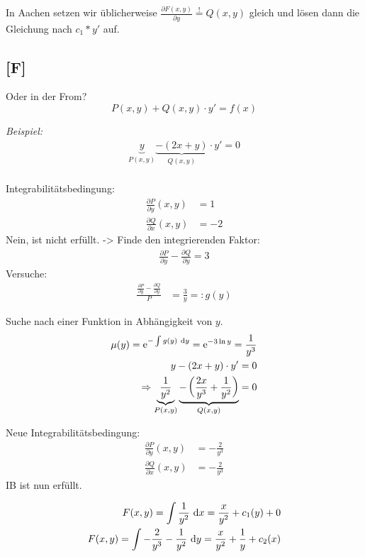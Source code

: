 \documentclass[main.tex]{subfiles}
\begin{document}
In Aachen setzen wir üblicherweise $\frac{\partial F(x,y)}{\partial y} \overset{!}{=} Q(x,y)$ gleich und lösen dann die Gleichung nach $c_1 * y'$ auf.

\subsection{[F]}
\vspace{6cm}
Oder in der From? 
$$
	P(x,y) + Q(x,y)\cdot y' = f(x)
$$

\textit{Beispiel:}
\begin{align*}
	\underbrace{y}_{P(x,y)} \underbrace{- (2x +y)}_{Q(x,y)} \cdot y' = 0 \\
\end{align*}

Integrabilitätsbedingung:
\begin{align*}
	\frac{\partial P}{\partial y}(x,y) &= 1 \\
	\frac{\partial Q}{\partial x}(x,y) &= -2 
\end{align*}
Nein, ist nicht erfüllt. 
-> Finde den integrierenden Faktor:
\begin{align*}
	\frac{\partial P}{\partial y} - \frac{\partial Q}{\partial y} = 3
\end{align*}
Versuche: 
\begin{align*}
	\frac{\frac{\partial P}{\partial y} - \frac{\partial Q}{\partial y}}{P} 
	&= \frac{3}{y} =: g(y)
\end{align*}

Suche nach einer Funktion in Abhängigkeit von $y$. 
\begin{align*}
	\mu(y) = \mathrm{e}^{-\int g(y)~\mathrm{d}y} = \mathrm{e}^{-3\ln y} = \frac{1}{y^3} \\
	y-(2x +y) \cdot y' = 0 \\
	\Rightarrow \underbrace{\frac{1}{y^2}}_{P(x,y)} \underbrace{ -\left(\frac{2x}{y^3} + \frac{1}{y^2} \right)}_{Q(x,y)} = 0
\end{align*}

Neue Integrabilitätsbedingung:
\begin{align*}
	\frac{\partial P}{\partial y}(x,y) &= - \frac{2}{y^3} \\
	\frac{\partial Q}{\partial x}(x,y) &= - \frac{2}{y^3} 
\end{align*}
IB ist nun erfüllt. 

\begin{align*}
	F(x,y) = \int \frac{1}{y^2} ~\mathrm{d}x = \frac{x}{y^2} + c_1(y) + 0\\
	F(x,y) = \int - \frac{2}{y^3} - \frac{1}{y^2} ~\mathrm{d}y = \frac{x}{y^2} + \frac{1}{y} + c_2(x)
\end{align*}
\end{document}
